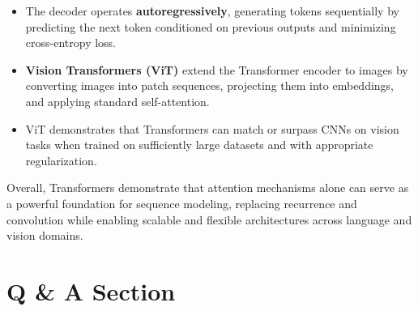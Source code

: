 \documentclass[11pt]{article}
\begin{document}
\begin{keytakeaway}
\begin{itemize}
\item The decoder operates \textbf{autoregressively}, generating tokens sequentially by predicting the next token conditioned on previous outputs and minimizing cross-entropy loss.

\item \textbf{Vision Transformers (ViT)} extend the Transformer encoder to images by converting images into patch sequences, projecting them into embeddings, and applying standard self-attention.

\item ViT demonstrates that Transformers can match or surpass CNNs on vision tasks when trained on sufficiently large datasets and with appropriate regularization.

\end{itemize}

\end{keytakeaway}

Overall, Transformers demonstrate that attention mechanisms alone can serve as a powerful foundation for sequence modeling, replacing recurrence and convolution while enabling scalable and flexible architectures across language and vision domains.

\section{Q \& A Section}
\end{document}
